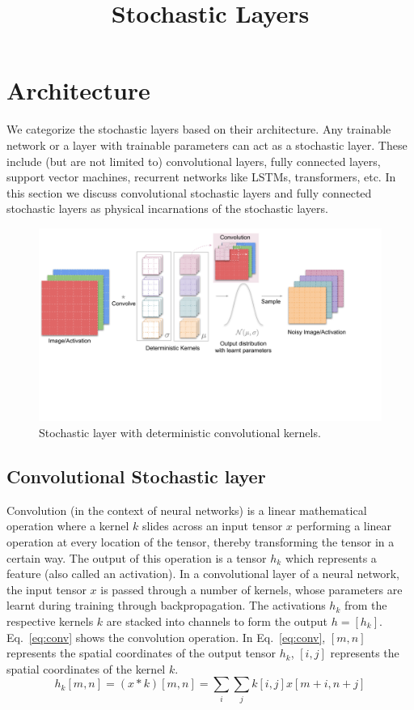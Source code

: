 \documentclass[12pt, letterpaper]{article}
\title{Stochastic Layers}
\date{}
\begin{document}
\vspace{-5cm}
\maketitle
\vspace{-2cm}

\section{Architecture}
We categorize the stochastic layers based on their architecture.
Any trainable network or a layer with trainable parameters can act as a stochastic layer. 
These include (but are not limited to) convolutional layers, fully connected layers, support vector machines, recurrent networks like LSTMs, transformers, etc. In this section we discuss convolutional stochastic layers and fully connected stochastic layers as physical incarnations of the stochastic layers.  
\begin{figure}[h!]
    \centering
    \includegraphics[width=\textwidth, trim={0 5cm 2.5cm 0}, clip]{deterministic(1).pdf}
    \caption{Stochastic layer with deterministic convolutional kernels.}
    \label{fig:deterministic}
\end{figure}

\subsection{Convolutional Stochastic layer}
\label{sec:conv}
Convolution (in the context of neural networks) is a linear mathematical operation where a kernel $k$ slides across an input tensor $x$ performing a linear operation at every location of the tensor, thereby transforming the tensor in a certain way. 
The output of this operation is a tensor $h_k$ which represents a feature (also called an activation). 
In a convolutional layer of a neural network, the input tensor $x$ is passed through a number of kernels, whose parameters are learnt during training through backpropagation. 
The activations $h_k$ from the respective kernels $k$ are stacked into channels to form the output $h=[h_k]$. Eq.~\eqref{eq:conv} shows the convolution operation. 
In Eq.~\eqref{eq:conv}, $[m,n]$ represents the spatial coordinates of the output tensor $h_k$, $[i,j]$ represents the spatial coordinates of the kernel $k$.
\begin{equation}
  h_k[m,n]=(x * k)[m,n]=\sum_i \sum_j k[i,j]x[m+i,n+j]
  \label{eq:conv}
\end{equation}
\end{document}

